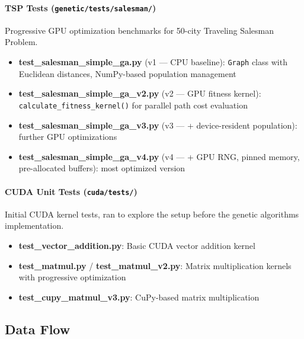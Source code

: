 \documentclass[a4paper,14pt]{extarticle}
\begin{document}
\paragraph{TSP Tests (\texttt{genetic/tests/salesman/})}

Progressive GPU optimization benchmarks for 50-city Traveling Salesman Problem.

\begin{itemize}
  \item \textbf{test\_salesman\_simple\_ga.py} (v1 --- CPU baseline): \texttt{Graph} class
        with Euclidean distances, NumPy-based population management
  \item \textbf{test\_salesman\_simple\_ga\_v2.py} (v2 --- GPU fitness kernel):
        \texttt{calculate\_fitness\_kernel()} for parallel path cost evaluation
  \item \textbf{test\_salesman\_simple\_ga\_v3.py} (v3 --- + device-resident population):
        further GPU optimizations
  \item \textbf{test\_salesman\_simple\_ga\_v4.py} (v4 --- + GPU RNG, pinned memory,
        pre-allocated buffers): most optimized version
\end{itemize}

\paragraph{CUDA Unit Tests (\texttt{cuda/tests/})}

Initial CUDA kernel tests, ran to explore the setup before the genetic algorithms implementation.

\begin{itemize}
  \item \textbf{test\_vector\_addition.py}: Basic CUDA vector addition kernel
  \item \textbf{test\_matmul.py} / \textbf{test\_matmul\_v2.py}: Matrix multiplication
        kernels with progressive optimization
  \item \textbf{test\_cupy\_matmul\_v3.py}: CuPy-based matrix multiplication
\end{itemize}


\subsection{Data Flow}
\end{document}
